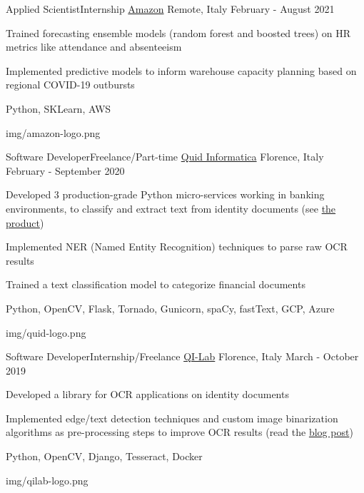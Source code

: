 \begin{cventries}
  \logocventry
    {Applied Scientist{\enskip\cdotp\enskip}Internship}
    {\href{https://www.amazon.com/}{Amazon}}
    {Remote, Italy}
    {February - August 2021}
    {
      \begin{cvitems}
        \item {Trained forecasting ensemble models (random forest and boosted trees) on HR metrics like attendance and absenteeism}
        \item {Implemented predictive models to inform warehouse capacity planning based on regional COVID-19 outbursts}
      \end{cvitems}
      \cvexptech
        {Python, SKLearn, AWS}
    }
    {img/amazon-logo.png}

  \logocventry
    {Software Developer{\enskip\cdotp\enskip}Freelance/Part-time}
    {\href{https://www.quidinfo.it/}{Quid Informatica}}
    {Florence, Italy}
    {February - September 2020}
    {
      \begin{cvitems}
        \item {Developed 3 production-grade Python micro-services working in banking environments, to classify and extract text from identity documents (see \textcolor{blue}{\href{https://www.youtube.com/watch?v=eyg-UOAdKA8}{the product}})}
        \item {Implemented NER (Named Entity Recognition) techniques to parse raw OCR results}
        \item {Trained a text classification model to categorize financial documents}
      \end{cvitems}
      \cvexptech
        {Python, OpenCV, Flask, Tornado, Gunicorn, spaCy, fastText, GCP, Azure}
    }
    {img/quid-logo.png}
  
  \logocventry
    {Software Developer{\enskip\cdotp\enskip}Internship/Freelance}
    {\href{https://www.qi-lab.it/}{QI-Lab}}
    {Florence, Italy}
    {March - October 2019}
    {
      \begin{cvitems}
        \item {Developed a library for OCR applications on identity documents}
        \item {Implemented edge/text detection techniques and custom image binarization algorithms as pre-processing steps to improve OCR results (read the \textcolor{blue}{\href{https://web.archive.org/web/20210616083923/https://www.qi-lab.it/2019/08/29/tecniche-thresholding-la-binarizzazione-immagini/}{blog post}})}
      \end{cvitems}
      \cvexptech
        {Python, OpenCV, Django, Tesseract, Docker}
    }
    {img/qilab-logo.png}


\end{cventries}
